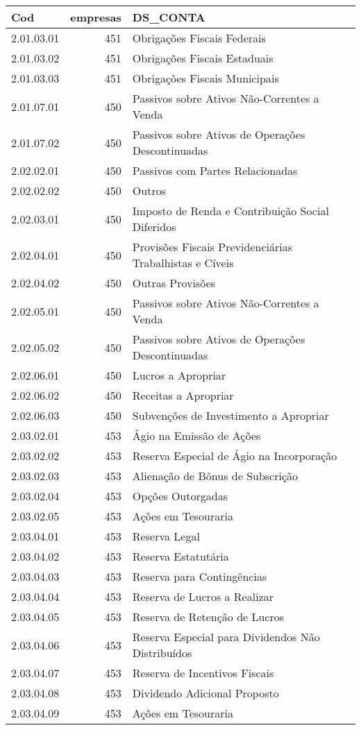 \begin{table}[ht]
\centering
\begin{tabular}{lrl}
  \hline
Cod & empresas & DS\_CONTA \\ 
  \hline
2.01.03.01 & 451 & Obrigações Fiscais Federais \\ 
  2.01.03.02 & 451 & Obrigações Fiscais Estaduais \\ 
  2.01.03.03 & 451 & Obrigações Fiscais Municipais \\ 
  2.01.07.01 & 450 & Passivos sobre Ativos Não-Correntes a Venda \\ 
  2.01.07.02 & 450 & Passivos sobre Ativos de Operações Descontinuadas \\ 
  2.02.02.01 & 450 & Passivos com Partes Relacionadas \\ 
  2.02.02.02 & 450 & Outros \\ 
  2.02.03.01 & 450 & Imposto de Renda e Contribuição Social Diferidos \\ 
  2.02.04.01 & 450 & Provisões Fiscais Previdenciárias Trabalhistas e Cíveis \\ 
  2.02.04.02 & 450 & Outras Provisões \\ 
  2.02.05.01 & 450 & Passivos sobre Ativos Não-Correntes a Venda \\ 
  2.02.05.02 & 450 & Passivos sobre Ativos de Operações Descontinuadas \\ 
  2.02.06.01 & 450 & Lucros a Apropriar \\ 
  2.02.06.02 & 450 & Receitas a Apropriar \\ 
  2.02.06.03 & 450 & Subvenções de Investimento a Apropriar \\ 
  2.03.02.01 & 453 & Ágio na Emissão de Ações \\ 
  2.03.02.02 & 453 & Reserva Especial de Ágio na Incorporação \\ 
  2.03.02.03 & 453 & Alienação de Bônus de Subscrição \\ 
  2.03.02.04 & 453 & Opções Outorgadas \\ 
  2.03.02.05 & 453 & Ações em Tesouraria \\ 
  2.03.04.01 & 453 & Reserva Legal \\ 
  2.03.04.02 & 453 & Reserva Estatutária \\ 
  2.03.04.03 & 453 & Reserva para Contingências \\ 
  2.03.04.04 & 453 & Reserva de Lucros a Realizar \\ 
  2.03.04.05 & 453 & Reserva de Retenção de Lucros \\ 
  2.03.04.06 & 453 & Reserva Especial para Dividendos Não Distribuídos \\ 
  2.03.04.07 & 453 & Reserva de Incentivos Fiscais \\ 
  2.03.04.08 & 453 & Dividendo Adicional Proposto \\ 
  2.03.04.09 & 453 & Ações em Tesouraria \\ 
   \hline
\end{tabular}
\end{table}
